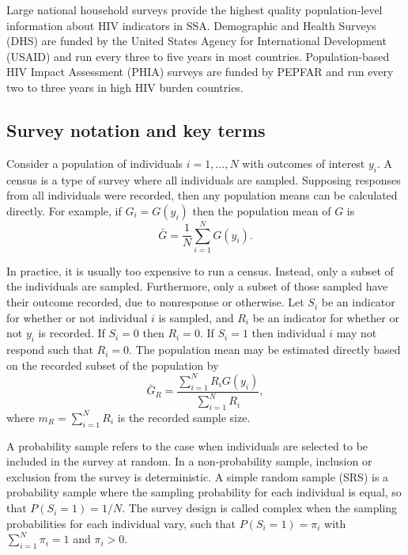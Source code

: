 \documentclass[a4paper, nobind]{templates/ociamthesis}
\begin{document}
Large national household surveys provide the highest quality population-level information about HIV indicators in SSA.
Demographic and Health Surveys (DHS) are funded by the United States Agency for International Development (USAID) and run every three to five years in most countries.
Population-based HIV Impact Assessment (PHIA) surveys are funded by PEPFAR and run every two to three years in high HIV burden countries.

\hypertarget{survey-notation-and-key-terms}{%
\subsection{Survey notation and key terms}\label{survey-notation-and-key-terms}}

Consider a population of individuals \(i = 1, \ldots, N\) with outcomes of interest \(y_i\).
A census is a type of survey where all individuals are sampled.
Supposing responses from all individuals were recorded, then any population means can be calculated directly.
For example, if \(G_i = G(y_i)\) then the population mean of \(G\) is
\begin{equation}
\bar G = \frac{1}{N} \sum_{i = 1}^N G(y_i).
\end{equation}

In practice, it is usually too expensive to run a census.
Instead, only a subset of the individuals are sampled.
Furthermore, only a subset of those sampled have their outcome recorded, due to nonresponse or otherwise.
Let \(S_i\) be an indicator for whether or not individual \(i\) is sampled, and \(R_i\) be an indicator for whether or not \(y_i\) is recorded.
If \(S_i = 0\) then \(R_i = 0\).
If \(S_i = 1\) then individual \(i\) may not respond such that \(R_i = 0\).
The population mean may be estimated directly based on the recorded subset of the population by
\begin{equation}
\bar G_R = \frac{\sum_{i = 1}^N R_i G(y_i)}{\sum_{i = 1}^N R_i}, \label{eq:direct}
\end{equation}
where \(m_R = \sum_{i = 1}^N R_i\) is the recorded sample size.

A probability sample refers to the case when individuals are selected to be included in the survey at random.
In a non-probability sample, inclusion or exclusion from the survey is deterministic.
A simple random sample (SRS) is a probability sample where the sampling probability for each individual is equal, so that \(P(S_i = 1) = 1 / N\).
The survey design is called complex when the sampling probabilities for each individual vary, such that \(P(S_i = 1) = \pi_i\) with \(\sum_{i = 1}^N \pi_i = 1\) and \(\pi_i > 0\).
\end{document}
